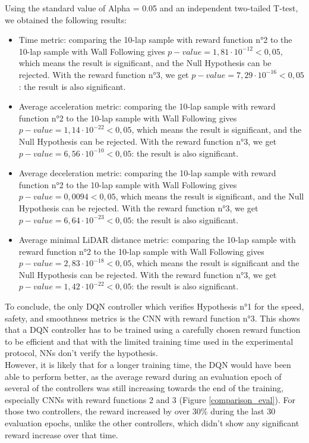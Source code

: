 Using the standard value of Alpha = 0.05 and an independent two-tailed T-test, we obtained the following results:

\begin{itemize}
	\item Time metric: comparing the 10-lap sample with reward function n°2 to the 10-lap sample with Wall Following gives $p-value=1,81 \cdot 10^{-12}<0,05$, which means the result is significant, and the Null Hypothesis can be rejected. With the reward function n°3, we get $p-value=7,29 \cdot 10^{-16}<0,05$: the result is also significant.
	\item Average acceleration metric: comparing the 10-lap sample with reward function n°2 to the 10-lap sample with Wall Following gives $p-value=1,14 \cdot 10^{-22}<0,05$, which means the result is significant, and the Null Hypothesis can be rejected. With the reward function n°3, we get $p-value=6,56 \cdot 10^{-10}<0,05$: the result is also significant.
	\item Average deceleration metric: comparing the 10-lap sample with reward function n°2 to the 10-lap sample with Wall Following gives $p-value=0,0094<0,05$, which means the result is significant, and the Null Hypothesis can be rejected. With the reward function n°3, we get $p-value=6,64 \cdot 10^{-23}<0,05$: the result is also significant.
	\item Average minimal LiDAR distance metric: comparing the 10-lap sample with reward function n°2 to the 10-lap sample with Wall Following gives $p-value=2,83 \cdot 10^{-18}<0,05$, which means the result is significant and the Null Hypothesis can be rejected. With the reward function n°3, we get $p-value=1,42 \cdot 10^{-22}<0,05$: the result is also significant.
\end{itemize} 

To conclude, the only DQN controller which verifies Hypothesis n°1 for the speed, safety, and smoothness metrics is the CNN with reward function n°3. This shows that a DQN controller has to be trained using a carefully chosen reward function to be efficient and that with the limited training time used in the experimental protocol, NNs don't verify the hypothesis. \\
However, it is likely that for a longer training time, the DQN would have been able to perform better, as the average reward during an evaluation epoch of several of the controllers was still increasing towards the end of the training, especially CNNs with reward functions 2 and 3 (Figure \ref{comparison_eval}). For those two controllers, the reward increased by over 30\% during the last 30 evaluation epochs, unlike the other controllers, which didn't show any significant reward increase over that time.

